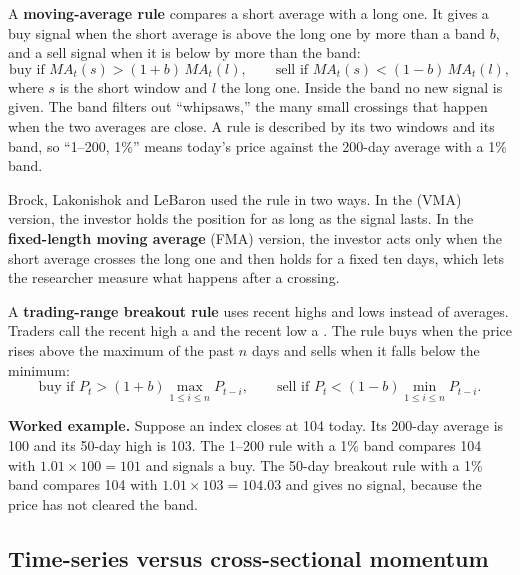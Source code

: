 A \textbf{moving-average rule} compares a short average with a long one. It gives a buy signal when the short average is above the long one by more than a band $b$, and a sell signal when it is below by more than the band:
\begin{equation}
  \text{buy if } MA_t(s) > (1+b)\,MA_t(l), \qquad \text{sell if } MA_t(s) < (1-b)\,MA_t(l),
  \label{eq:08-marule}
\end{equation}
where $s$ is the short window and $l$ the long one. Inside the band no new signal is given. The band filters out ``whipsaws,'' the many small crossings that happen when the two averages are close. A rule is described by its two windows and its band, so ``1--200, 1\%'' means today's price against the 200-day average with a 1\% band.

Brock, Lakonishok and LeBaron used the rule in two ways. In the  (VMA) version, the investor holds the position for as long as the signal lasts. In the \textbf{fixed-length moving average} (FMA) version, the investor acts only when the short average crosses the long one and then holds for a fixed ten days, which lets the researcher measure what happens after a crossing.

A \textbf{trading-range breakout rule} uses recent highs and lows instead of averages. Traders call the recent high a  and the recent low a . The rule buys when the price rises above the maximum of the past $n$ days and sells when it falls below the minimum:
\begin{equation}
  \text{buy if } P_t > (1+b)\max_{1\le i\le n} P_{t-i}, \qquad \text{sell if } P_t < (1-b)\min_{1\le i\le n} P_{t-i}.
  \label{eq:08-trb}
\end{equation}

\textbf{Worked example.} Suppose an index closes at 104 today. Its 200-day average is 100 and its 50-day high is 103. The 1--200 rule with a 1\% band compares 104 with $1.01 \times 100 = 101$ and signals a buy. The 50-day breakout rule with a 1\% band compares 104 with $1.01 \times 103 = 104.03$ and gives no signal, because the price has not cleared the band.

\subsection{Time-series versus cross-sectional momentum}

